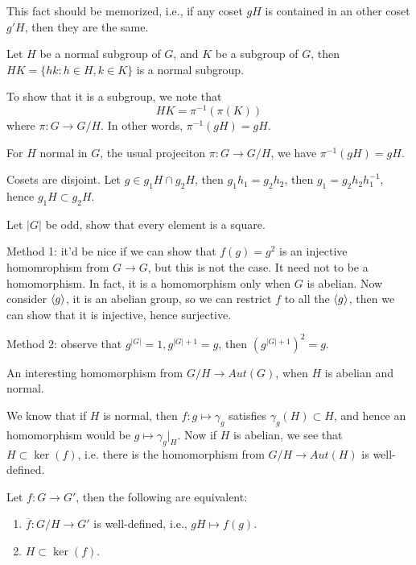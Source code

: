 \begin{warn}
    This fact should be memorized, i.e., if any coset $gH$ is contained in an other coset $g'H$, then they are the same.
\end{warn}

\begin{example}
    Let $H$ be a normal subgroup of $G$, and $K$ be a subgroup of $G$, then $HK=\{hk: h\in H, k\in K\}$ is a normal subgroup.
    
    To show that it is a subgroup, we note that 
    \begin{equation*}
        HK=\pi^{-1}(\pi(K))
    \end{equation*}
    where $\pi: G\to G/H$. In other words, $\pi^{-1}(gH)=gH$.
    \begin{lem}
        For $H$ normal in $G$, the usual projeciton $\pi: G\to G/H$, we have $\pi^{-1}(gH)=gH$.
    \end{lem}
\end{example}
\begin{example}
    Cosets are disjoint. Let $g\in g_1H\cap g_2H$, then $g_1h_1=g_2h_2$, then $g_1=g_2h_2h_1^{-1}$, hence $g_1H\subset g_2H$.
\end{example}
\begin{example}[8.13]
    Let $|G|$ be odd, show that every element is a square.
    
    Method 1: it'd be nice if we can show that $f(g)=g^2$ is an injective homomrophism from $G\to G$, but this is not the case. It need not to be a homomorphism. In fact, it is a homomorphism only when $G$ is abelian. Now consider $\langle g\rangle$, it is an abelian group, so we can restrict $f$ to all the $\langle g\rangle$, then we can show that it is injective, hence surjective. 

    Method 2: observe that $g^{|G|}=1, g^{|G|+1}=g$, then $(g^{|G|+1})^2=g$.
\end{example}
\begin{example}[8.25]
    An interesting homomorphism from $G/H\to Aut(G)$, when $H$ is abelian and normal.

    We know that if $H$ is normal, then $f: g\mapsto \gamma_g$ satisfies $\gamma_g(H)\subset H$, and hence an homomorphism would be $g\mapsto\gamma_g\vert_H$. Now if $H$ is abelian, we see that $H\subset\ker(f)$, i.e. there is the homomorphism from $G/H\to Aut(H)$ is well-defined.
    \begin{lem}
        Let $f: G\to G'$, then the following are equivalent:
        \begin{enumerate}
            \item $\overline{f}: G/H\to G'$ is well-defined, i.e., $gH\mapsto f(g)$.
            \item $H\subset\ker(f)$.
        \end{enumerate}
    \end{lem}
\end{example}

